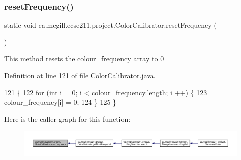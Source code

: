 \mbox{\label{classca_1_1mcgill_1_1ecse211_1_1project_1_1_color_calibrator_ab6148d75e3a105016580e90ed1ea9bc9}} 
\subsubsection{\texorpdfstring{reset\+Frequency()}{resetFrequency()}}
{\footnotesize\ttfamily static void ca.\+mcgill.\+ecse211.\+project.\+Color\+Calibrator.\+reset\+Frequency (\begin{DoxyParamCaption}{ }\end{DoxyParamCaption})\hspace{0.3cm}{\ttfamily [static]}}

This method resets the colour\+\_\+frequency array to 0 

Definition at line 121 of file Color\+Calibrator.\+java.


\begin{DoxyCode}
121                                       \{
122     \textcolor{keywordflow}{for} (\textcolor{keywordtype}{int} i = 0; i < colour\_frequency.length; i ++) \{
123       colour\_frequency[i] = 0;
124     \}
125   \}
\end{DoxyCode}
Here is the caller graph for this function\+:
\nopagebreak
\begin{figure}[H]
\begin{center}
\leavevmode
\includegraphics[width=350pt]{classca_1_1mcgill_1_1ecse211_1_1project_1_1_color_calibrator_ab6148d75e3a105016580e90ed1ea9bc9_icgraph}
\end{center}
\end{figure}
\mbox{\label{classca_1_1mcgill_1_1ecse211_1_1project_1_1_color_calibrator_a40906193773ead0bfd582f188413c97a}} 
